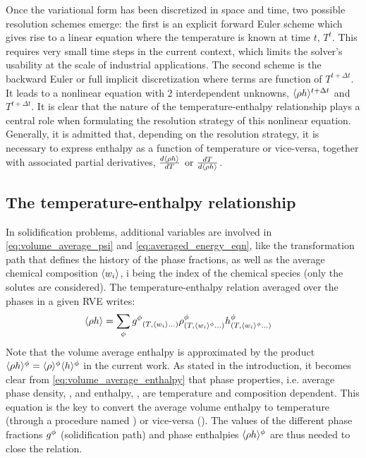 Once the variational form has been discretized in space and time, two possible resolution schemes emerge: the first is an 
explicit forward Euler scheme which gives rise to a linear equation where the temperature is known at time $t$, $T^t$. This requires very small 
time steps in the current context, which limits the solver’s usability at the scale of industrial applications. The second scheme is the 
backward Euler or full implicit discretization where terms are function of $T^{t+\Delta t}$. It leads to a nonlinear equation with 2 interdependent 
unknowns, $\langle  \rho h  \rangle^{t+\Delta t}$ and  $T^{t+\Delta t}$. It is clear that the nature of the temperature-enthalpy relationship plays a central 
role when formulating the resolution strategy of this nonlinear equation. Generally, it is admitted that, depending on the resolution strategy, 
it is necessary to express enthalpy as a function of temperature or vice-versa, together with associated partial derivatives, 
$\frac{d \langle  \rho h  \rangle}{dT}$ or $\frac{dT }{d \langle  \rho h  \rangle}$.

\subsection{The temperature-enthalpy relationship} 
In solidification problems, additional variables are involved in \cref{eq:volume_average_psi} and \cref{eq:averaged_energy_eqn}, 
like the transformation path that defines the history of the phase fractions, as well as the average chemical composition $\langle w_i \rangle$, 
i being the index of the chemical species (only the solutes are considered). The temperature-enthalpy relation averaged over the 
phases in a given RVE writes:
\begin{align}
\label{eq:volume_average_enthalpy}
& \rh = \sum_\phi \gphi_{\brac{T, \wi \dots}} \rphi_{\brac{T, \wi^{\phi} \dots}} \hphi_{\brac{T, \wi^{\phi} \dots}}
\end{align}
Note that the volume average enthalpy is approximated by the product $\langle \rho h \rangle^{\phi}=\langle \rho \rangle^{\phi}\langle h \rangle^{\phi}$ in the current work. As stated 
in the introduction, it becomes clear from \cref{eq:volume_average_enthalpy} that phase properties, i.e. average phase density, , \rphi and enthalpy, \hphi, 
are temperature and composition dependent. This equation is the key to convert the average volume enthalpy to temperature (through a procedure named \HtoT) 
or vice-versa (\TtoH). The values of the different phase fractions ${g^{\phi}} $ (solidification path) and phase enthalpies $\langle  \rho h  \rangle^{\phi}$ are thus needed 
to close the relation.

